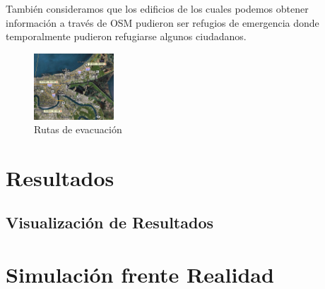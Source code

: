 También consideramos que los edificios de los cuales podemos obtener
información a través de OSM pudieron ser refugios de emergencia donde
temporalmente pudieron refugiarse algunos ciudadanos.

\begin{figure}[H]
 \centering
 \includegraphics[width=30mm]{figuras/cap6/Rutas de evacuacion.png}
\caption{Rutas de evacuación}
\end{figure}

\section*{Resultados}
\subsection*{Visualización de Resultados}
\section*{Simulación frente Realidad}

